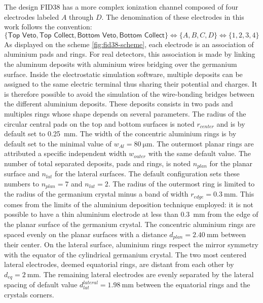The design FID38 has a more complex ionization channel composed of four electrodes labeled $A$ through $D$. The denomination of these electrodes in this work follows the convention:
\begin{equation}
\label{eq:fid38-convention}
\lbrace \textsf{Top Veto}, \textsf{Top Collect}, \textsf{Bottom Veto}, \textsf{Bottom Collect} \rbrace
\Leftrightarrow 
\lbrace A, B, C, D \rbrace
\Leftrightarrow
\lbrace 1, 2, 3, 4 \rbrace
\end{equation}
 As displayed on the scheme \ref{fig:fid38-scheme}, each electrode is an association of aluminium pads and rings. 
For real detectors, this association is made by linking the aluminum deposits with aluminium wires bridging over the germanium surface.
Inside the electrostatic simulation software, multiple deposits can be assigned to the same electric terminal thus sharing their potential and charges. It is therefore possible to avoid the simulation of the wire-bonding bridges between the different aluminium deposits.
These deposits consists in two pads and multiples rings whose shape depends on several parameters. The radius of the circular central pads on the top and bottom surfaces is noted $r_{center}$ and is by default set to \SI{0.25}{\mm}. The width of the concentric aluminium rings is by default set to the minimal value of $w_{Al} = \SI{80}{\micro\meter}$. The outermost planar rings are attributed a specific independent width $w_{outer}$ with the same default value. The number of total separated deposits, pads and rings, is noted $n_{plan}$ for the planar surface and $n_{lat}$ for the lateral surfaces. The default configuration sets these numbers to $n_{plan}=7$ and $n_{lat}=2$. The radius of the outermost ring is limited to the radius of the germanium crystal minus a band of width $r_{edge}=\SI{0.3}{\mm}$. This comes from the limits of the aluminium deposition technique employed: it is not possible to have a thin aluminium electrode at less than \SI{0.3}{\mm} from the edge of the planar surface of the germanium crystal. The concentric aluminium rings are spaced evenly on the planar surfaces with a distance $d_{plan}=\SI{2.40}{\mm}$ between their center. On the lateral surface, aluminium rings respect the mirror symmetry with the equator of the cylindrical germanium crystal. The two most centered lateral electrodes, deemed equatorial rings, are distant from each other by $d_{eq}=\SI{2}{\mm}$. The remaining lateral electrodes are evenly separated by the lateral spacing of default value $d_{lat}^{lateral}=\SI{1.98}{\mm}$ between the equatorial rings and the crystals corners.
